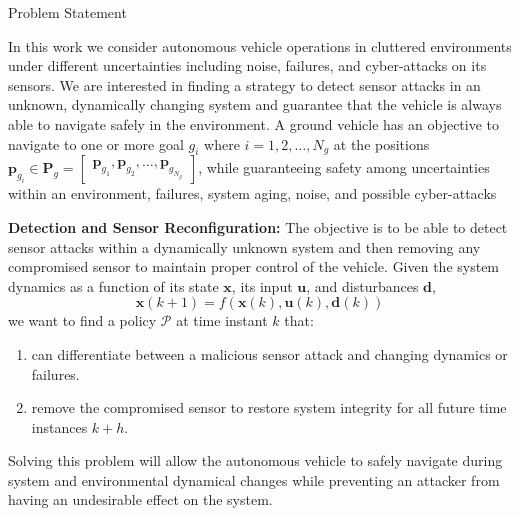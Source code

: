 \begin{section}{Problem Statement}
	
\label{sec:problem}

In this work we consider autonomous vehicle operations in cluttered environments under different uncertainties including noise, failures, and cyber-attacks on its sensors. 
We are interested in finding a strategy to detect sensor attacks in an unknown, dynamically changing system and guarantee that the vehicle is always able to navigate safely in the environment. A ground vehicle has an objective to navigate to one or more goal $g_i$ where $i=1,2,\dots,N_g$ at the positions $\bm{p}_{g_i} \in \bm{P}_g =  \begin{bmatrix} \bm{p}_{g_1},\bm{p}_{g_2},\dots,\bm{p}_{g_{N_g}} \end{bmatrix}$, while guaranteeing safety among uncertainties within an environment, failures, system aging, noise, and possible cyber-attacks







\begin{problem} 
\label{problem1} {\textbf{Detection and Sensor Reconfiguration:}} 
The objective is to be able to detect sensor attacks within a dynamically unknown system and then removing any compromised sensor to maintain proper control of the vehicle. Given the system dynamics as a function of its state $ \bm{x} $, its input $ \bm{u}$, and disturbances $ \bm{d} $,
	\begin{equation}
		\bm{x}(k+1) = f(\bm{x}(k), \bm{u}(k), \bm{d}(k))
	\end{equation}
we want to find a policy $\mathcal{P}$ at time instant $k$ that:
\begin{enumerate}
	\item can differentiate between a malicious sensor attack and changing dynamics or failures. 
	\item remove the compromised sensor to restore system integrity for all future time instances $k+h$. 
\end{enumerate}
Solving this problem will allow the autonomous vehicle to safely navigate during system and environmental dynamical changes while preventing an attacker from having an undesirable effect on the system. 
\end{problem}
	

\end{section}
